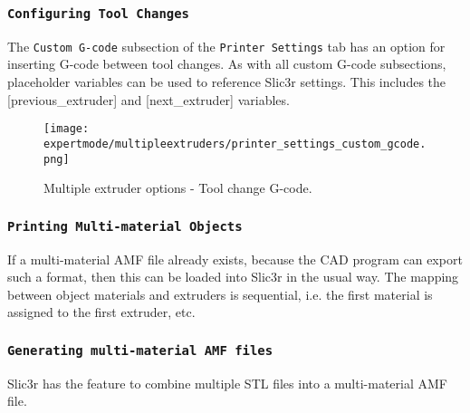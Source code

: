 
\subsubsection{\texttt{Configuring Tool Changes}} %
\label{sub:configuring_tool_changes}


The \texttt{Custom G-code} subsection of the \texttt{Printer Settings} tab has an option for inserting G-code between tool changes.  As with all custom G-code subsections, placeholder variables can be used to reference Slic3r settings.  This includes the [previous\_extruder] and [next\_extruder] variables.

\begin{figure}[H]
\centering
\texttt{[image: expertmode/multipleextruders/printer\_settings\_custom\_gcode.png]}
\caption{Multiple extruder options - Tool change G-code.}
\label{fig:printer_settings_custom_gcode}
\end{figure}



\subsubsection{\texttt{Printing Multi-material Objects}} %
\label{sub:printing_multi_material_objects}

If a multi-material AMF file already exists, because the CAD program can export such a format, then this can be loaded into Slic3r in the usual way.  The mapping between object materials and extruders is sequential, i.e. the first material is assigned to the first extruder, etc.



\subsubsection{\texttt{Generating multi-material AMF files}} %
\label{sub:generating_multi_material_amf_files}

Slic3r has the feature to combine multiple STL files into a multi-material AMF file.


